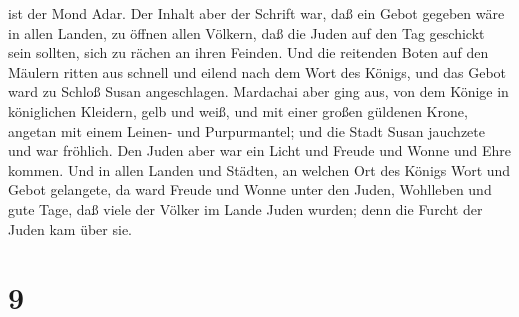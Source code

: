 ist der Mond Adar.  Der Inhalt aber der Schrift war, daß
ein Gebot gegeben wäre in allen Landen, zu öffnen allen Völkern, daß die
Juden auf den Tag geschickt sein sollten, sich zu rächen an ihren
Feinden.  Und die reitenden Boten auf den Mäulern ritten
aus schnell und eilend nach dem Wort des Königs, und das Gebot ward zu
Schloß Susan angeschlagen.  Mardachai aber ging aus, von
dem Könige in königlichen Kleidern, gelb und weiß, und mit einer großen
güldenen Krone, angetan mit einem Leinen- und Purpurmantel; und die
Stadt Susan jauchzete und war fröhlich.  Den Juden aber war
ein Licht und Freude und Wonne und Ehre kommen.  Und in
allen Landen und Städten, an welchen Ort des Königs Wort und Gebot
gelangete, da ward Freude und Wonne unter den Juden, Wohlleben und gute
Tage, daß viele der Völker im Lande Juden wurden; denn die Furcht der
Juden kam über sie.

\hypertarget{section-8}{%
\section{9}\label{section-8}}

